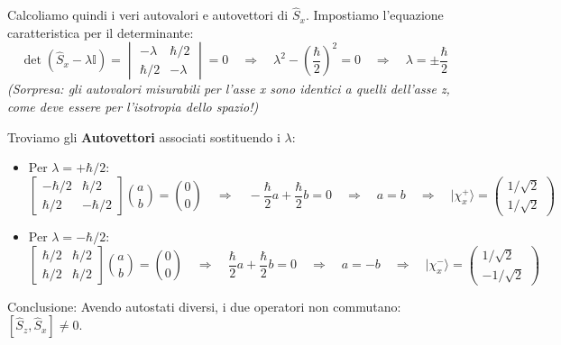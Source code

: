 \documentclass[11pt, a4paper]{article}
\begin{document}
\noindent
Calcoliamo quindi i veri autovalori e autovettori di $\hat{S}_x$. Impostiamo l'equazione caratteristica per il determinante: %
\begin{equation*}
    \det(\hat{S}_x - \lambda \mathbb{I}) = \begin{vmatrix} -\lambda & \hbar/2 \\ \hbar/2 & -\lambda \end{vmatrix} = 0 \quad \Rightarrow \quad \lambda^2 - \left(\frac{\hbar}{2}\right)^2 = 0 \quad \Rightarrow \quad \boxed{ \lambda = \pm \frac{\hbar}{2} } %
\end{equation*}
\textit{(Sorpresa: gli autovalori misurabili per l'asse x sono identici a quelli dell'asse z, come deve essere per l'isotropia dello spazio!)} %

Troviamo gli \textbf{Autovettori} associati sostituendo i $\lambda$: %
\begin{itemize}
    \item Per $\lambda = +\hbar/2$: %
    \begin{equation*}
        \begin{bmatrix} -\hbar/2 & \hbar/2 \\ \hbar/2 & -\hbar/2 \end{bmatrix} \binom{a}{b} = \binom{0}{0} \quad \Rightarrow \quad -\frac{\hbar}{2}a + \frac{\hbar}{2}b = 0 \quad \Rightarrow \quad a = b \quad \Rightarrow \quad |\chi_x^+\rangle = \begin{pmatrix} 1/\sqrt{2} \\ 1/\sqrt{2} \end{pmatrix} %
    \end{equation*}
    
    \item Per $\lambda = -\hbar/2$: %
    \begin{equation*}
        \begin{bmatrix} \hbar/2 & \hbar/2 \\ \hbar/2 & \hbar/2 \end{bmatrix} \binom{a}{b} = \binom{0}{0} \quad \Rightarrow \quad \frac{\hbar}{2}a + \frac{\hbar}{2}b = 0 \quad \Rightarrow \quad a = -b \quad \Rightarrow \quad |\chi_x^-\rangle = \begin{pmatrix} 1/\sqrt{2} \\ -1/\sqrt{2} \end{pmatrix} %
    \end{equation*}
\end{itemize}
Conclusione: Avendo autostati diversi, i due operatori non commutano: $\boxed{ [\hat{S}_z, \hat{S}_x] \neq 0 }$. %
\end{document}
